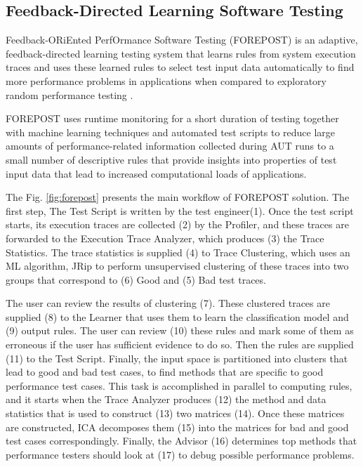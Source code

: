 \subsection{Feedback-Directed Learning Software Testing}

Feedback-ORiEnted PerfOrmance Software Testing (FOREPOST) is an adaptive, feedback-directed learning testing system that learns rules from system execution traces and uses these learned rules to select test input data automatically to find more performance problems in applications when compared to exploratory random performance testing \cite{Grechanik2012}.

FOREPOST uses runtime monitoring for a short duration of testing together with machine learning techniques and automated test scripts to reduce large amounts of performance-related information collected during AUT runs to a small number of descriptive rules that provide insights into properties of test input data that lead to increased computational loads of applications.

The Fig. \ref{fig:forepost} presents the main workflow of FOREPOST solution. The first step,  The Test Script is written  by the test engineer(1). Once the test script starts, its execution traces are collected (2) by the Profiler, and these traces are forwarded to the Execution Trace Analyzer, which produces (3) the Trace Statistics. The trace statistics is supplied (4) to Trace Clustering, which uses an ML algorithm, JRip to perform unsupervised clustering of these traces into two groups that correspond to (6) Good and (5) Bad test traces. 

The user can review the results of clustering (7). These clustered traces are supplied (8) to the Learner that uses them to learn the classification model and (9) output rules. The user can review (10) these rules and mark some of them as erroneous if the user has sufficient evidence to do so. Then the rules are supplied (11) to the Test Script. Finally, the input space is partitioned into clusters that lead to good and bad test cases, to find methods that are specific to good performance test cases. This task is accomplished in parallel to computing rules, and it starts when the Trace Analyzer produces (12) the method and data statistics that is used to construct (13) two matrices (14). Once these matrices are constructed, ICA decomposes them (15) into the matrices for bad and good test cases correspondingly. Finally, the Advisor (16) determines top methods that performance testers should look at (17) to debug possible performance problems.



